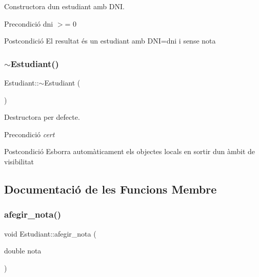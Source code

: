 Constructora d\textquotesingle{}un estudiant amb D\+NI. 

\begin{DoxyPrecond}{Precondició}
dni $>$= 0 
\end{DoxyPrecond}
\begin{DoxyPostcond}{Postcondició}
El resultat és un estudiant amb D\+NI=dni i sense nota 
\end{DoxyPostcond}
\mbox{\label{class_estudiant_a2e2bd22924dacfe16acf12b5c31efd01}} 
\subsubsection{\texorpdfstring{$\sim$\+Estudiant()}{~Estudiant()}}
{\footnotesize\ttfamily Estudiant\+::$\sim$\+Estudiant (\begin{DoxyParamCaption}{ }\end{DoxyParamCaption})}



Destructora per defecte. 

\begin{DoxyPrecond}{Precondició}
{\itshape cert} 
\end{DoxyPrecond}
\begin{DoxyPostcond}{Postcondició}
Esborra automàticament els objectes locals en sortir d\textquotesingle{}un àmbit de visibilitat 
\end{DoxyPostcond}


\subsection{Documentació de les Funcions Membre}
\mbox{\label{class_estudiant_a8a2186560dce4ccfc5922d2c98f21305}} 
\subsubsection{\texorpdfstring{afegir\+\_\+nota()}{afegir\_nota()}}
{\footnotesize\ttfamily void Estudiant\+::afegir\+\_\+nota (\begin{DoxyParamCaption}\item[{double}]{nota }\end{DoxyParamCaption})}



